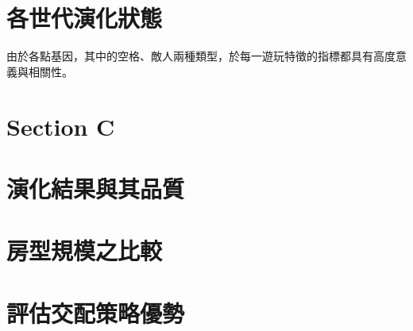 \section{各世代演化狀態}
\label{sec:experiment-evolutions}

由於各點基因，其中的空格、敵人兩種類型，於每一遊玩特徵的指標都具有高度意義與相關性。



\section{Section C}
\label{sec:experiment-zzz}




\section{演化結果與其品質}
\label{sec:experiment-xxx}



\section{房型規模之比較}
\label{sec:experiment-yyy}




\section{評估交配策略優勢}
\label{sec:experiment-zzzz}



